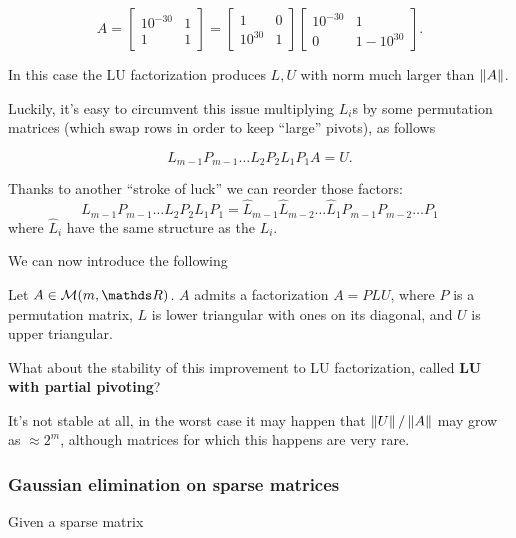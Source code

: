 \documentclass[computational_mathematics.tex]{subfiles}
\begin{document}
\begin{example}
\[
A = \begin{bmatrix}
    10^{-30} & 1\\
    1 & 1
\end{bmatrix} = \begin{bmatrix}
    1 & 0\\
    10^{30} & 1 
\end{bmatrix}
\begin{bmatrix}
    10^{-30} & 1\\
    0 & 1-10^{30}
\end{bmatrix}.
\]

In this case the LU factorization produces $L,U$ with norm much larger than $\left\lVert A\right\rVert$.
\end{example}

Luckily, it's easy to circumvent this issue multiplying $L_i$s by some permutation matrices (which swap rows in order to keep ``large'' pivots), as follows

\[
L_{m-1}P_{m-1}\dots L_2P_2L_1P_1A = U.
\]

\begin{obs}
Thanks to another ``stroke of luck'' we can reorder those factors: 
\[
L_{m-1}P_{m-1}\dots L_2P_2L_1P_1 = \widehat{L}_{m-1}\widehat{L}_{m-2}\dots \widehat{L}_1 P_{m-1}P_{m-2}\dots P_1
\]
where $\widehat{L}_i$ have the same structure as the $L_i$.
\end{obs}

We can now introduce the following

\begin{theorem}
  Let $A \in \mathcal{M}(m, \R)$. $A$ admits a factorization $A=PLU$, where $P$ is a permutation matrix, $L$ is lower triangular with ones on its diagonal, and $U$ is upper triangular.
\end{theorem}

What about the stability of this improvement to LU factorization, called \textbf{LU with partial pivoting}?

It's not stable at all, in the worst case it may happen that $\left\lVert U\right\rVert / \left\lVert A\right\rVert$ may grow as $\approx 2^m$, although matrices for which this happens are very rare.

\subsubsection{Gaussian elimination on sparse matrices}

Given a sparse matrix 
\end{document}
